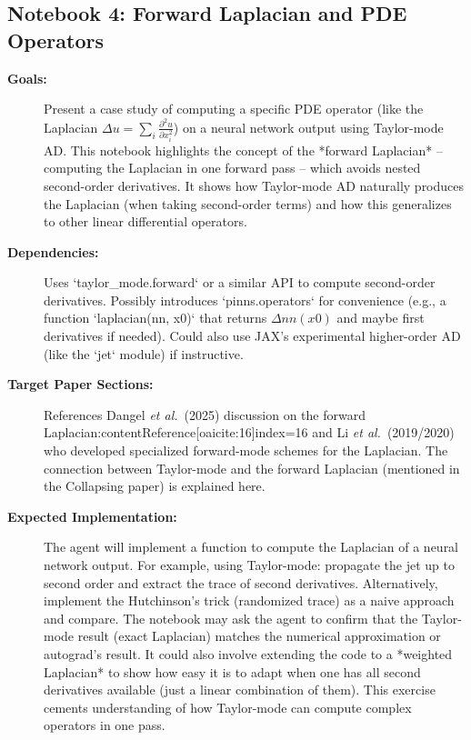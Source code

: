 \documentclass[11pt]{article}
\begin{document}
\subsection{Notebook 4: Forward Laplacian and PDE Operators}
\begin{description}
  \item[\textbf{Goals:}] Present a case study of computing a specific PDE operator (like the Laplacian $\Delta u = \sum_i \frac{\partial^2 u}{\partial x_i^2}$) on a neural network output using Taylor-mode AD. This notebook highlights the concept of the *forward Laplacian* – computing the Laplacian in one forward pass – which avoids nested second-order derivatives. It shows how Taylor-mode AD naturally produces the Laplacian (when taking second-order terms) and how this generalizes to other linear differential operators.
  \item[\textbf{Dependencies:}] Uses `taylor_mode.forward` or a similar API to compute second-order derivatives. Possibly introduces `pinns.operators` for convenience (e.g., a function `laplacian(nn, x0)` that returns $\Delta nn(x0)$ and maybe first derivatives if needed). Could also use JAX's experimental higher-order AD (like the `jet` module) if instructive.
  \item[\textbf{Target Paper Sections:}] References Dangel \textit{et al.}\ (2025) discussion on the forward Laplacian:contentReference[oaicite:16]{index=16} and Li \textit{et al.}\ (2019/2020) who developed specialized forward-mode schemes for the Laplacian. The connection between Taylor-mode and the forward Laplacian (mentioned in the Collapsing paper) is explained here.
  \item[\textbf{Expected Implementation:}] The agent will implement a function to compute the Laplacian of a neural network output. For example, using Taylor-mode: propagate the jet up to second order and extract the trace of second derivatives. Alternatively, implement the Hutchinson's trick (randomized trace) as a naive approach and compare. The notebook may ask the agent to confirm that the Taylor-mode result (exact Laplacian) matches the numerical approximation or autograd's result. It could also involve extending the code to a *weighted Laplacian* to show how easy it is to adapt when one has all second derivatives available (just a linear combination of them). This exercise cements understanding of how Taylor-mode can compute complex operators in one pass.
\end{description}
\end{document}
